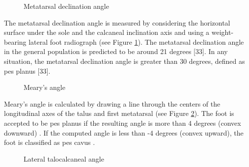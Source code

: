 \begin{figure}[htbp]
\centering
{}
\caption{Metatarsal declination angle \cite{davies2012imaging}}
\label{fig:MethodologyMetatarsalDeclinationAngle}
\end{figure}

The metatarsal declination angle is measured by considering the horizontal surface under the sole and the calcaneal inclination axis and using a weight-bearing lateral foot radiograph (see Figure \ref{fig:MethodologyMetatarsalDeclinationAngle}). The metatarsal declination angle in the general population is predicted to be around 21 degrees [33]. In any situation, the metatarsal declination angle is greater than 30 degrees, defined as pes planus [33].

\begin{figure}[htbp]
\centering
{}
\caption{Meary's angle \cite{radiopaediamearysangle}}
\label{fig:MethodologyMearysAngle}
\end{figure}

Meary's angle \cite{deniz2014ccocuklardaki} is calculated by drawing a line through the centers of the longitudinal axes of the talus and first metatarsal (see Figure \ref{fig:MethodologyMearysAngle}). The foot is accepted to be pes planus if the resulting angle is more than 4 degrees (convex downward) \cite{vanderwilde1988measurements}. If the computed angle is less than -4 degrees (convex upward), the foot is classified as pes cavus \cite{banks2001mcglamry}.

\begin{figure}[htbp]
\centering
{}
\caption{Lateral talocalcaneal angle \cite{radiopaediamearysangle}}
\label{fig:MethodologyLateralTalocalcanealAngle}
\end{figure}

